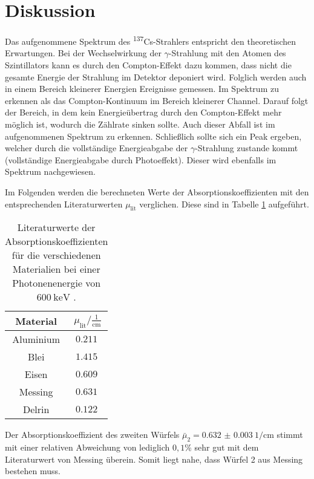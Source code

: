 \section{Diskussion}
\label{sec:Diskussion}

Das aufgenommene Spektrum des \textsuperscript{137}Cs-Strahlers entspricht den
theoretischen Erwartungen. Bei der Wechselwirkung der $\gamma$-Strahlung mit den
Atomen des Szintillators kann es durch den Compton-Effekt dazu kommen, dass
nicht die gesamte Energie der Strahlung im Detektor deponiert wird. Folglich werden
auch in einem Bereich kleinerer Energien Ereignisse gemessen. Im Spektrum zu erkennen
als das Compton-Kontinuum im Bereich kleinerer Channel. Darauf folgt der Bereich,
in dem kein Energieübertrag durch den Compton-Effekt mehr möglich ist, wodurch die
Zählrate sinken sollte. Auch dieser Abfall ist im aufgenommenen Spektrum zu erkennen.
Schließlich sollte sich ein Peak ergeben, welcher durch die vollständige Energieabgabe
der $\gamma$-Strahlung zustande kommt (vollständige Energieabgabe durch Photoeffekt).
Dieser wird ebenfalls im Spektrum nachgewiesen.

Im Folgenden werden die berechneten Werte der Absorptionskoeffizienten mit den
entsprechenden Literaturwerten $\mu_{\mathrm{lit}}$ verglichen. Diese sind in Tabelle \ref{tab:literatur}
aufgeführt.

\begin{table}[H]
  \centering
  \caption{Literaturwerte der Absorptionskoeffizienten für die verschiedenen Materialien bei einer
  Photonenenergie von $\SI{600}{\kilo\eV}$ \cite{sample2}.}
  \label{tab:literatur}
  \begin{tabular}{c c}
    \toprule
    Material &  $\mu_{\mathrm{lit}} / \frac{1}{\mathrm{cm}}$  \\
    \midrule
        Aluminium    & $\SI{0.211}{}$ \\
        Blei    & $\SI{1.415}{}$ \\
        Eisen & $\SI{0.609}{}$ \\
        Messing    & $\SI{0.631}{}$ \\
        Delrin & $\SI{0.122}{}$ \\
    \bottomrule
  \end{tabular}
\end{table}

Der Absorptionskoeffizient des zweiten Würfels $\bar\mu_2 = \SI{0.632(3)}{1\per\centi\meter}$
stimmt mit einer relativen Abweichung von lediglich $0,1$\% sehr gut mit dem Literaturwert
von Messing überein. Somit liegt nahe, dass Würfel 2 aus Messing bestehen muss.

